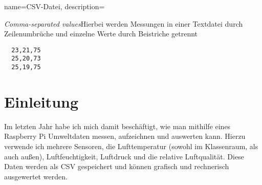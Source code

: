 {
  name=CSV-Datei,
  description={\textit{Comma-separated values}\newline Hierbei werden Messungen in einer Textdatei durch Zeilenumbrüche und einzelne Werte durch Beistriche getrennt
  \begin{verbatim}
  23,21,75
  25,20,73
  25,19,75
  \end{verbatim}
  }
}
\chapter{Einleitung}

Im letzten Jahr habe ich mich damit beschäftigt, wie man mithilfe eines Raspberry Pi Umweltdaten messen, aufzeichnen und auswerten kann. Hierzu verwende ich mehrere Sensoren, die Lufttemperatur (sowohl im Klassenraum, als auch außen), Luftfeuchtigkeit, Luftdruck und die relative Luftqualität. Diese Daten werden als \gls{CSV} gespeichert und können grafisch und rechnerisch ausgewertet werden.  